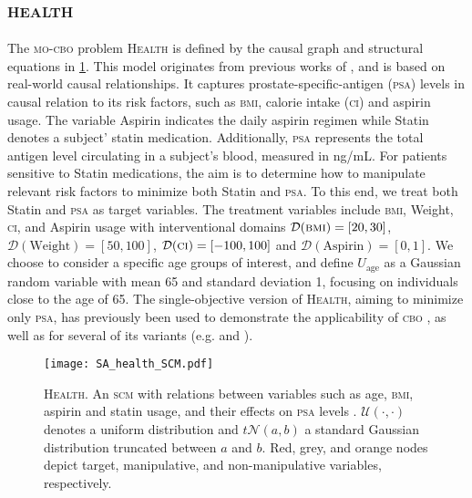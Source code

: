 \subsection{\textsc{health}}
The \textsc{mo-cbo} problem \textsc{Health} is defined by the causal graph and structural equations in \cref{fig:experiments.healthcare.scm}. This model originates from previous works of \citet{ferro_healthcare}, and is based on real-world causal relationships. It captures prostate-specific-antigen (\textsc{psa}) levels in causal relation to its risk factors, such as \textsc{bmi}, calorie intake (\textsc{ci}) and aspirin usage. The variable Aspirin indicates the daily aspirin regimen while Statin denotes a subject' statin medication. Additionally, \textsc{psa} represents the total antigen level circulating in a subject’s blood, measured in ng/mL. For patients sensitive to Statin medications, the aim is to determine how to manipulate relevant risk factors to minimize both Statin and \textsc{psa}. To this end, we treat both Statin and \textsc{psa} as target variables. The treatment variables include \textsc{bmi}, Weight, \textsc{ci}, and Aspirin usage with interventional domains $\mathcal{D}(\textsc{bmi}) = [20,30]$, $\mathcal{D}(\text{Weight})=[50,100]$, $\mathcal{D}(\textsc{ci})=[-100,100]$ and $\mathcal{D}(\text{Aspirin})= [0,1]$. We choose to consider a specific age groups of interest, and define $U_{\text{age}}$ as a Gaussian random variable with mean 65 and standard deviation 1, focusing on individuals close to the age of 65. The single-objective version of \textsc{Health}, aiming to minimize only \textsc{psa}, has previously been used to demonstrate the applicability of \textsc{cbo} \citep{CBO}, as well as for several of its variants (e.g. \citet{pmlr-v216-gultchin23a} and \citet{pmlr-v202-aglietti23a}). 

\begin{figure}[t!]
    \centering
    \vspace{-17cm}
    \texttt{[image: SA\_health\_SCM.pdf]}
    \vspace{-4.2cm}
    \caption{\textsc{Health}. An \textsc{scm} with relations between variables such as age, \textsc{bmi}, aspirin and statin usage, and their effects on \textsc{psa} levels \citep{pmlr-v216-gultchin23a}. $\mathcal{U}(\cdot,\cdot)$ denotes a uniform distribution and $t\mathcal{N}(a,b)$ a standard Gaussian distribution truncated between $a$ and $b$. Red, grey, and orange nodes depict target, manipulative, and non-manipulative variables, respectively.}
    \label{fig:experiments.healthcare.scm}
\end{figure}